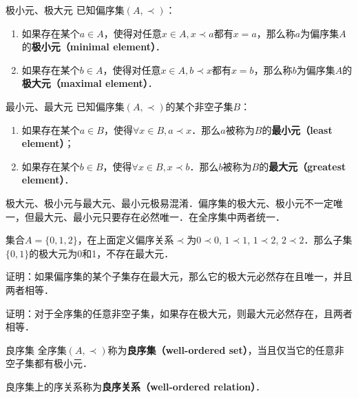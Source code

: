 \begin{definition}{极小元、极大元}
已知偏序集$(A,\prec)$：
\begin{enumerate}
\item 如果存在某个$a \in A$，使得对任意$x \in A, x\prec a$都有$x = a$，那么称$a$为偏序集$A$的\textbf{极小元（minimal element）}．
\item 如果存在某个$b \in A$，使得对任意$x \in A, b\prec x$都有$x = b$，那么称$b$为偏序集$A$的\textbf{极大元（maximal element）}．
\end{enumerate}
\end{definition}

\begin{definition}{最小元、最大元}
已知偏序集$(A,\prec)$的某个非空子集$B$：
\begin{enumerate}
\item 如果存在某个$a \in B$，使得$\forall x \in B, a \prec x$．那么$a$被称为$B$的\textbf{最小元（least element）}；
\item 如果存在某个$b \in B$，使得$\forall x \in B, x \prec b$．那么$b$被称为$B$的\textbf{最大元（greatest element）}．
\end{enumerate}
\end{definition}

极大元、极小元与最大元、最小元极易混淆．偏序集的极大元、极小元不一定唯一，但最大元、最小元只要存在必然唯一．在全序集中两者统一．

\begin{example}{}
集合$A=\{0,1,2\}$，在上面定义偏序关系$\prec$为$0\prec 0$, $1\prec 1$, $1\prec 2$, $2\prec 2$．那么子集$\{0,1\}$的极大元为0和1，不存在最大元．
\end{example}

\begin{exercise}{}
证明：如果偏序集的某个子集存在最大元，那么它的极大元必然存在且唯一，并且两者相等．
\end{exercise}

\begin{exercise}{}
证明：对于全序集的任意非空子集，如果存在极大元，则最大元必然存在，且两者相等．
\end{exercise}

\begin{definition}{良序集}
全序集$(A,\prec)$称为\textbf{良序集（well-ordered set）}，当且仅当它的任意非空子集都有极小元．
\end{definition}

良序集上的序关系称为\textbf{良序关系（well-ordered relation）}．